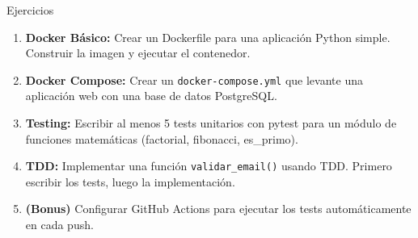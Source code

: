 \documentclass[aspectratio=169]{beamer}
\begin{document}
\begin{frame}{Ejercicios}
    \begin{enumerate}
        \setlength\itemsep{0.7em}
        \item \textbf{Docker Básico:} Crear un Dockerfile para una aplicación Python simple. Construir la imagen y ejecutar el contenedor.
        
        \item \textbf{Docker Compose:} Crear un \texttt{docker-compose.yml} que levante una aplicación web con una base de datos PostgreSQL.
        
        \item \textbf{Testing:} Escribir al menos 5 tests unitarios con pytest para un módulo de funciones matemáticas (factorial, fibonacci, es\_primo).
        
        \item \textbf{TDD:} Implementar una función \texttt{validar\_email()} usando TDD. Primero escribir los tests, luego la implementación.
        
        \item \textbf{(Bonus)} Configurar GitHub Actions para ejecutar los tests automáticamente en cada push.
    \end{enumerate}
\end{frame}
\end{document}

